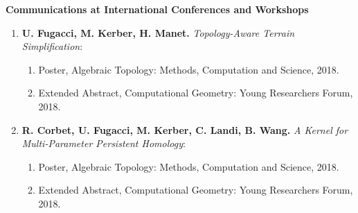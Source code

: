 \documentclass[11pt]{article}
\begin{document}
\noindent
{\bf Communications at International Conferences and Workshops}
\begin{enumerate}

\item {\bf U. Fugacci, M. Kerber, H. Manet.} {\em Topology-Aware Terrain Simplification}:
\begin{enumerate}
  \item Poster, Algebraic Topology: Methods, Computation and Science, 2018.
  \item Extended Abstract, Computational Geometry: Young Researchers Forum, 2018.
\end{enumerate}

\item {\bf R. Corbet, U. Fugacci, M. Kerber, C. Landi, B. Wang.} {\em A Kernel for Multi-Parameter Persistent Homology}:
\begin{enumerate}
  \item Poster, Algebraic Topology: Methods, Computation and Science, 2018.
  \item Extended Abstract, Computational Geometry: Young Researchers Forum, 2018.
\end{enumerate}


\end{enumerate}
\vspace*{1ex}
\end{document}
